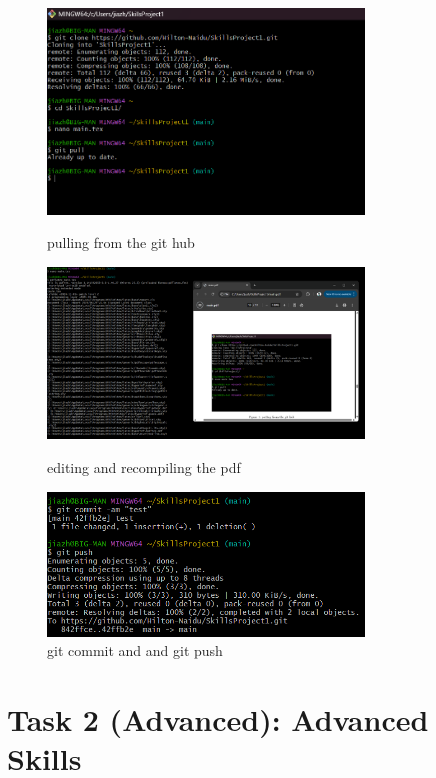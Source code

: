 \documentclass[a4paper, 11pt]{report}
\begin{document}
\begin{figure}
\centering
\includegraphics[width=0.75\textwidth]{skillsD1.png}
\caption{pulling from the git hub}

\includegraphics[width=0.75\textwidth]{skillsD2.png}
\caption{editing and recompiling the pdf}

\includegraphics[width=0.75\textwidth]{skillsD3.png}
\caption{git commit and and git push}
\end{figure}



\newpage
\section{Task 2 (Advanced): Advanced Skills}
\end{document}
